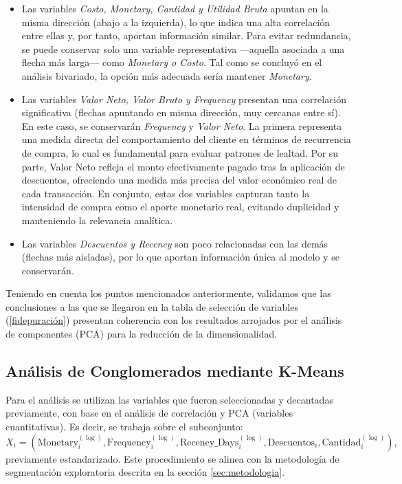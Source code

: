 \begin{itemize}
    \item Las variables \textit{Costo, Monetary, Cantidad y Utilidad Bruta} apuntan en la misma dirección (abajo a la izquierda), lo que indica una alta correlación entre ellas y, por tanto, aportan información similar. Para evitar redundancia, se puede conservar solo una variable representativa —aquella asociada a una flecha más larga— como \textit{Monetary o Costo}. Tal como se concluyó en el análisis bivariado, la opción más adecuada sería mantener \textit{Monetary}.
    \item Las variables \textit{Valor Neto, Valor  Bruto y Frequency} presentan una correlación significativa (flechas apuntando en misma dirección, muy cercanas entre sí). En este caso, se conservarán \textit{Frequency} y \textit{Valor Neto}. La primera representa una medida directa del comportamiento del cliente en términos de recurrencia de compra, lo cual es fundamental para evaluar patrones de lealtad. Por su parte, Valor Neto refleja el monto efectivamente pagado tras la aplicación de descuentos, ofreciendo una medida más precisa del valor económico real de cada transacción. En conjunto, estas dos variables capturan tanto la intensidad de compra como el aporte monetario real, evitando duplicidad y manteniendo la relevancia analítica.
    \item Las variables \textit{Descuentos y Recency} son poco relacionadas con las demás (flechas más aisladas), por lo que aportan información única al modelo y se conservarán.
\end{itemize}

Teniendo en cuenta los puntos mencionados anteriormente, validamos que las conclusiones a las que se llegaron en la tabla de selección de variables (\ref{fidepuración}) presentan coherencia con los resultados arrojados por el análisis de componentes (PCA) para la reducción de la dimensionalidad.

\subsection{Análisis de Conglomerados mediante K-Means}

Para el análisis se utilizan las variables que fueron seleccionadas y decantadas previamente, con base en el análisis de correlación y PCA (variables cuantitativas). Es decir, se trabaja sobre el subconjunto:
$$
X_i = (\text{Monetary}_i^{(\log)}, \text{Frequency}_i^{(\log)}, \text{Recency\_Days}_i^{(\log)}, \text{Descuentos}_i, \text{Cantidad}_i^{(\log)}),
$$
previamente estandarizado. Este procedimiento se alinea con la metodología de segmentación exploratoria descrita en la sección \ref{sec:metodologia}.


